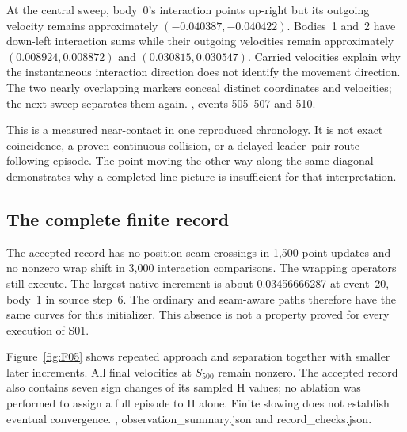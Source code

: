 At the central sweep, body~0's interaction points up-right but its
outgoing velocity remains approximately $(-0.040387,-0.040422)$.
Bodies~1 and~2 have down-left interaction sums while their outgoing
velocities remain approximately $(0.008924,0.008872)$ and
$(0.030815,0.030547)$. Carried velocities explain why the instantaneous
interaction direction does not identify the movement direction.
The two nearly overlapping markers conceal distinct coordinates and
velocities; the next sweep separates them again.
\cite{replay01}, events 505--507 and 510. 

This is a measured near-contact in one reproduced chronology. It is not
exact coincidence, a proven continuous collision, or a delayed
leader--pair route-following episode. The point moving the other way
along the same diagonal demonstrates why a completed line picture is
insufficient for that interpretation. 

\subsection{The complete finite record}
The accepted record has no position seam crossings in 1,500 point
updates and no nonzero wrap shift in 3,000 interaction comparisons.
The wrapping operators still execute. The largest native increment is
about 0.03456666287 at event~20, body~1 in source step~6.
The ordinary and seam-aware paths therefore have the same curves for
this initializer. This absence is not a property proved for every
execution of S01. 

Figure~\ref{fig:F05} shows repeated approach and separation together with
smaller later increments. All final velocities at $S_{500}$ remain
nonzero. The accepted record also contains seven sign changes of its
sampled H values; no ablation was performed to assign a full episode
to H alone. Finite slowing does not establish eventual convergence.
\cite{replay01}, observation\_summary.json and record\_checks.json.
\FloatBarrier
